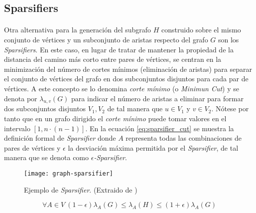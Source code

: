 \documentclass{subfiles}
\begin{document}
      \subsection{Sparsifiers}
      \label{sec:sparsifiers}

        \paragraph{}
        Otra alternativa para la generación del subgrafo $H$ construido sobre el mismo conjunto de vértices y un subconjunto de aristas respecto del grafo $G$ son los \emph{Sparsifiers}. En este caso, en lugar de tratar de mantener la propiedad de la distancia del camino más corto entre pares de vértices, se centran en la minimización del número de cortes mínimos (eliminación de aristas) para separar el conjunto de vértices del grafo en dos subconjuntos disjuntos para cada par de vértices. A este concepto se lo denomina \emph{corte mínimo} (o \emph{Minimun Cut}) y se denota por $\lambda_{u,v}(G)$ para indicar el número de aristas a eliminar para formar dos subconjuntos disjuntos $V_{1}, V_{2}$ de tal manera que $u\in V_{1}$ y $v \in V_{2}$. Nótese por tanto que en un grafo dirigido el \emph{corte mínimo} puede tomar valores en el intervalo $[1, n\cdot(n-1)]$.  En la ecuación \eqref{eq:sparsifier_cut} se muestra la definición formal de \emph{Sparsifier} donde $A$ representa todas las combinaciones de pares de vértices y $\epsilon$ la desviación máxima permitida por el \emph{Sparsifier}, de tal manera que se denota como \emph{$\epsilon$-Sparsifier}.

        \begin{figure}
          \centering
          \texttt{[image: graph-sparsifier]}
          \caption{Ejemplo de \emph{Sparsifier}. (Extraido de \cite{harvey2011randomized})}
          \label{img:graph_community_structure}
        \end{figure}

        \begin{equation}
        \label{eq:sparsifier_cut}
          \forall A \in V \  (1-\epsilon)\lambda_A(G)\leq\lambda_A(H)\leq(1+\epsilon)\lambda_A(G)
        \end{equation}
\end{document}
